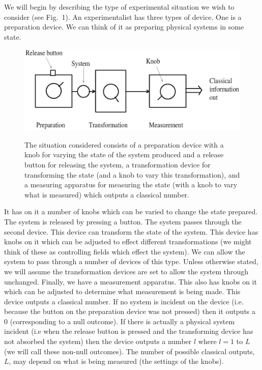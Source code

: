 \documentclass[10pt,twocolumn]{article}
\begin{document}
We will begin by describing the type of experimental situation we wish
to consider (see Fig.~1).  An experimentalist has three types of device.
One is a preparation device.  We can think of it as preparing physical
systems in some state.
\begin{figure}[t]
{\includegraphics{qaxiomf1.eps}}
\caption{The situation considered consists of a preparation device with
a knob for varying the state of the system produced and a release button
for releasing the system, a transformation device for transforming the
state (and a knob to vary this transformation), and a measuring
apparatus for measuring the state (with a knob to vary what is measured)
which outputs a classical number.}
\end{figure}
It has on it a number of knobs which can be
varied to change the state prepared.  The system is released by
pressing a button. The system passes through the second device.
This device can transform the
state of the system.  This device has knobs on it which can be
adjusted to effect different transformations (we might think of these as
controlling fields which effect the system). We can allow the system
to pass through a number of devices of this type.  Unless otherwise
stated, we will assume the transformation devices are set to allow the
system through unchanged.
Finally, we have a
measurement apparatus. This also has knobs on it which can be adjusted
to determine what measurement is being made.  This device outputs a
classical number.  If no system is incident on the device (i.e.
because the button on the preparation device was not pressed)
then it outputs a 0 (corresponding to a null outcome). If there is
actually a physical system incident (i.e when the release button is
pressed and the transforming device has not absorbed the system)
then the device outputs a number $l$
where $l=1$ to $L$ (we will call these  non-null outcomes).
The number of possible classical
outputs, $L$, may depend on what is being measured (the settings of the
knobs).
\end{document}
